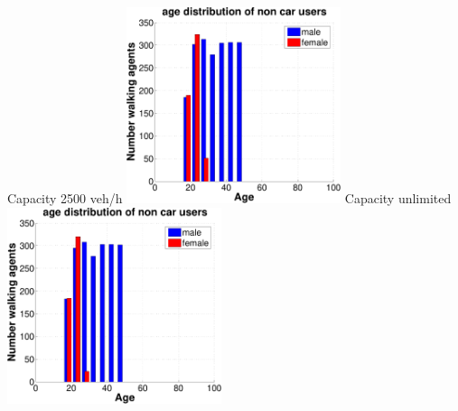 {  \createsubfigure%
  {Capacity 2500 veh/h}%
  {\includegraphics[width=0.47\textwidth, angle=0, trim=0mm 0mm 0mm 9mm, clip=true]{extending/figures/MultiModalSimulation/simulations/age_distribution_scatter_2500}}%
  {\label{}}%
  {\hspace{3mm}}%
  \createsubfigure%
  {Capacity unlimited}%
  {\includegraphics[width=0.47\textwidth, angle=0, trim=0mm 0mm 0mm 9mm, clip=true]{extending/figures/MultiModalSimulation/simulations/age_distribution_scatter_unlimited}}%
  {\label{}}%
  {}%
}%
{}

